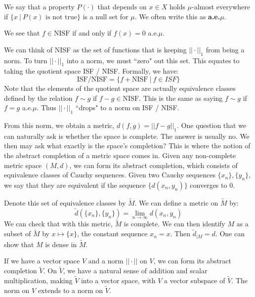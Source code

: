 \documentclass[a4paper,12pt]{report}
\newenvironment{definition}[1][Definition.]{\begin{trivlist}
\item[\hskip \labelsep {\bfseries #1}]}{\end{trivlist}}
\newenvironment{remark}[1][Remark.]{\begin{trivlist}
\item[\hskip \labelsep {\bfseries #1}]}{\end{trivlist}}
\begin{document}
	\begin{definition}
	We say that a property $P(\cdot)$ that depends on $x \in X$ holds $\mu$-almost everywhere if $\{ x ~|~ P(x) \text{ is not true} \}$ is a null set for $\mu$. We often write this as \textbf{a.e.$\mu$}.
	\end{definition}
	
	\begin{remark}
	We see that $f \in \text{NISF}$ if and only if $f(x) = 0$ a.e.$\mu$.
	\end{remark}
	
	\noindent We can think of NISF as the set of functions that is keeping $||\cdot||_1$ from being a norm. To turn $||\cdot||_1$ into a norm, we must ``zero" out this set. This equates to taking the quotient space ISF / NISF. Formally, we have:
	\[ \text{ISF} / \text{NISF} = \{ f + \text{NISF} ~|~ f \in ISF \} \]
	Note that the elements of the quotient space are actually equivalence classes defined by the relation $f \sim g$ if $f - g \in \text{NISF}$. This is the same as saying $f \sim g$ if $f = g$ a.e.$\mu$. Thus $||\cdot||_1$ ``drops" to a norm on ISF / NISF.
	
	 From this norm, we obtain a metric, $d(f, g) = ||f - g||_1$. One question that we can naturally ask is whether the space is complete. The answer is usually no. We then may ask what exactly is the space's completion? This is where the notion of the abstract completion of a metric space comes in. Given any non-complete metric space $(M, d)$, we can form its abstract completion, which consists of equivalence classes of Cauchy sequences. Given two Cauchy sequences $\{x_n\}, \{y_n\}$, we say that they are equivalent if the sequence $\{d(x_n, y_n)\}$ converges to 0.
	 
	 Denote this set of equivalence classes by $\tilde{M}$. We can define a metric on $\tilde{M}$ by:
	 \[ \tilde{d}(\{x_n\}, \{y_n\}) = \lim_{n \rightarrow \infty} d(x_n, y_n) \] 
	We can check that with this metric, $\tilde{M}$ is complete. We can then identify $M$ as a subset of $\tilde{M}$ by $x \mapsto \{x\}$, the constant sequence $x_n = x$. Then $\tilde{d}_{|M} = d$. One can show that $M$ is dense in $\tilde{M}$. 
	
	If we have a vector space $V$ and a norm $||\cdot||$ on $V$, we can form its abstract completion $\tilde{V}$. On $\tilde{V}$, we have a natural sense of addition and scalar multiplication, making $\tilde{V}$ into a vector space, with $V$ a vector subspace of $\tilde{V}$. The norm on $V$ extends to a norm on $\tilde{V}$. 
	
\end{document}

